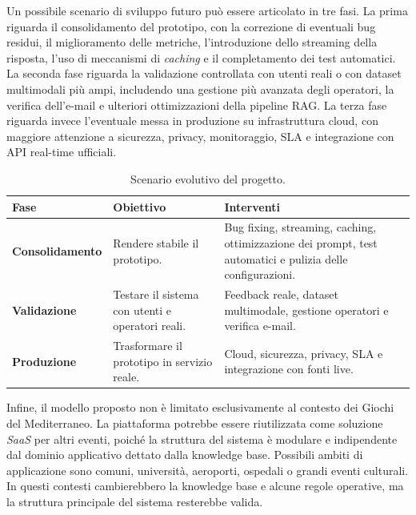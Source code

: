 Un possibile scenario di sviluppo futuro può essere articolato in tre fasi. La prima riguarda il consolidamento del prototipo, con la correzione di eventuali bug residui, il miglioramento delle metriche, l’introduzione dello streaming della risposta, l’uso di meccanismi di \textit{caching} e il completamento dei test automatici. La seconda fase riguarda la validazione controllata con utenti reali o con dataset multimodali più ampi, includendo una gestione più avanzata degli operatori, la verifica dell’e-mail e ulteriori ottimizzazioni della pipeline RAG. La terza fase riguarda invece l’eventuale messa in produzione su infrastruttura cloud, con maggiore attenzione a sicurezza, privacy, monitoraggio, SLA e integrazione con API real-time ufficiali.

\begin{table}[H]
\centering
\caption{Scenario evolutivo del progetto.}
\label{tab:roadmap-evoluzione}
{\small
\begin{tabular}{p{}p{}p{}}
\toprule
\textbf{Fase} & \textbf{Obiettivo} & \textbf{Interventi}\tabularnewline
\midrule
\textbf{Consolidamento} & Rendere stabile il prototipo. & Bug fixing, streaming, caching, ottimizzazione dei prompt, test automatici e pulizia delle configurazioni.\tabularnewline
\textbf{Validazione} & Testare il sistema con utenti e operatori reali. & Feedback reale, dataset multimodale, gestione operatori e verifica e-mail.\tabularnewline
\textbf{Produzione} & Trasformare il prototipo in servizio reale. & Cloud, sicurezza, privacy, SLA e integrazione con fonti live.\tabularnewline
\bottomrule
\end{tabular}
}
\end{table}

Infine, il modello proposto non è limitato esclusivamente al contesto dei Giochi del Mediterraneo. La piattaforma potrebbe essere riutilizzata come soluzione \textit{SaaS} per altri eventi, poiché la struttura del sistema è modulare e indipendente dal dominio applicativo dettato dalla knowledge base. Possibili ambiti di applicazione sono comuni, università, aeroporti, ospedali o grandi eventi culturali. In questi contesti cambierebbero la knowledge base e alcune regole operative, ma la struttura principale del sistema resterebbe valida.